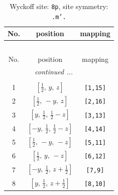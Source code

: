 \documentclass[fleqn,8pt]{jsarticle}
\begin{document}
\begin{longtable}{ccc}
\caption{Wyckoff site: {\tt 8p}, site symmetry: {\tt .m'.}}
 \\
 \hline \hline
No. & position & mapping \\ \hline \endfirsthead

\multicolumn{2}{l}{\tablename\ \thetable{}} \\
 \hline \hline
No. & position & mapping \\ \hline \endhead

 \hline \hline
\multicolumn{2}{r}{\footnotesize\it continued ...} \\ \endfoot

 \hline \hline
\multicolumn{2}{r}{} \\ \endlastfoot

1 & $\left[ \frac{1}{2},\, y,\, z \right]$ & {\tt [1,15]} \\ \hline
2 & $\left[ \frac{1}{2},\, - y,\, z \right]$ & {\tt [2,16]} \\ \hline
3 & $\left[ y,\, \frac{1}{2},\, \frac{1}{2} - z \right]$ & {\tt [3,13]} \\ \hline
4 & $\left[ - y,\, \frac{1}{2},\, \frac{1}{2} - z \right]$ & {\tt [4,14]} \\ \hline
5 & $\left[ \frac{1}{2},\, - y,\, - z \right]$ & {\tt [5,11]} \\ \hline
6 & $\left[ \frac{1}{2},\, y,\, - z \right]$ & {\tt [6,12]} \\ \hline
7 & $\left[ - y,\, \frac{1}{2},\, z + \frac{1}{2} \right]$ & {\tt [7,9]} \\ \hline
8 & $\left[ y,\, \frac{1}{2},\, z + \frac{1}{2} \right]$ & {\tt [8,10]} \\
\end{longtable}
\renewcommand{\arraystretch}{1.2}
\end{document}
